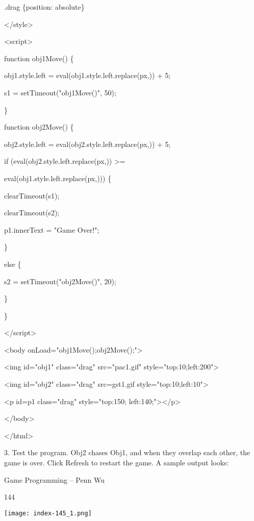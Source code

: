 \documentclass[
]{article}
\begin{document}
.drag \{position: absolute\}

\textless/style\textgreater{}

\textless script\textgreater{}

function obj1Move() \{

obj1.style.left =
eval(obj1.style.left.replace(\textquotesingle px\textquotesingle,\textquotesingle\textquotesingle))
+ 5;

s1 = setTimeout("obj1Move()", 50);

\}

function obj2Move() \{

obj2.style.left =
eval(obj2.style.left.replace(\textquotesingle px\textquotesingle,\textquotesingle\textquotesingle))
+ 5;

if
(eval(obj2.style.left.replace(\textquotesingle px\textquotesingle,\textquotesingle\textquotesingle))
\textgreater=

eval(obj1.style.left.replace(\textquotesingle px\textquotesingle,\textquotesingle\textquotesingle)))
\{

clearTimeout(s1);

clearTimeout(s2);

p1.innerText = "Game Over!";

\}

else \{

s2 = setTimeout("obj2Move()", 20);

\}

\}

\textless/script\textgreater{}

\textless body onLoad="obj1Move();obj2Move();"\textgreater{}

\textless img id="obj1" class="drag" src="pac1.gif"
style="top:10;left:200"\textgreater{}

\textless img id="obj2" class="drag"
src=\textquotesingle gst1.gif\textquotesingle{}
style="top:10;left:10"\textgreater{}

\textless p id=p1 class="drag" style="top:150;
left:140;"\textgreater\textless/p\textgreater{}

\textless/body\textgreater{}

\textless/html\textgreater{}

3. Test the program. Obj2 chases Obj1, and when they overlap each other,
the game is over. Click Refresh to restart the game. A sample output
looks:

Game Programming -- Penn Wu

144

\protect\hypertarget{index_split_009.htmlux5cux23p145}{}{}\texttt{[image: index-145\_1.png]}
\end{document}

